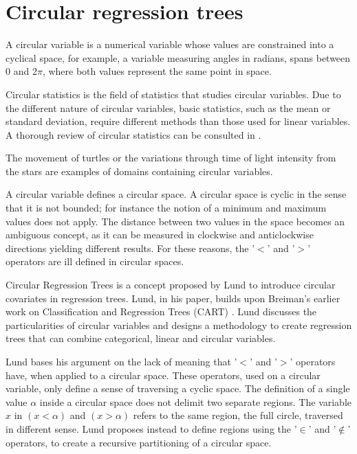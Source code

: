 \documentclass[times,twocolumn,final,authoryear]{elsarticle}
\begin{document}
\section{Circular regression trees}

A circular variable is a numerical variable whose values are constrained into a cyclical space, for example, a variable measuring angles in radians, spans between 0 and 2$ \pi $, where both values represent the same point in space. 

Circular statistics is the field of statistics that studies circular variables. Due to the different nature of circular variables, basic statistics, such as the mean or standard deviation, require different methods than those used for linear variables. A thorough review of circular statistics can be consulted in \citep{Fisher1992}. 

The movement of turtles \citep{Fisher1993} or the variations through time of light intensity from the stars \citep{Huerta1999} are examples of domains containing circular variables.

A circular variable defines a circular space. A circular space is cyclic in the sense that it is not bounded; for instance the notion of a minimum and maximum values does not apply. The distance between two values in the space becomes an ambiguous concept, as it can be measured in clockwise and anticlockwise directions yielding different results. For these reasons, the '$<$' and '$>$' operators are ill defined in circular spaces.

Circular Regression Trees is a concept proposed by Lund \citep{Lund2002} to introduce circular covariates in regression trees. Lund, in his paper, builds upon Breiman's earlier work on Classification and Regression Trees (CART) \citep{Breimanetal1984}. Lund discusses the particularities of circular variables and designs a methodology to create regression trees that can combine categorical, linear and circular variables.

Lund bases his argument on the lack of meaning that '$<$' and '$>$' operators have, when applied to a circular space. These operators, used on a circular variable, only define a sense of traversing a cyclic space. The definition of a single value $\alpha$ inside a circular space does not delimit two separate regions. The variable $x$ in $(x < \alpha)$ and $(x > \alpha)$ refers to the same region, the full circle, traversed in different sense. Lund proposes instead to define regions using the '$\in$' and '$\notin$' operators, to create a recursive partitioning of a circular space. 
\end{document}
